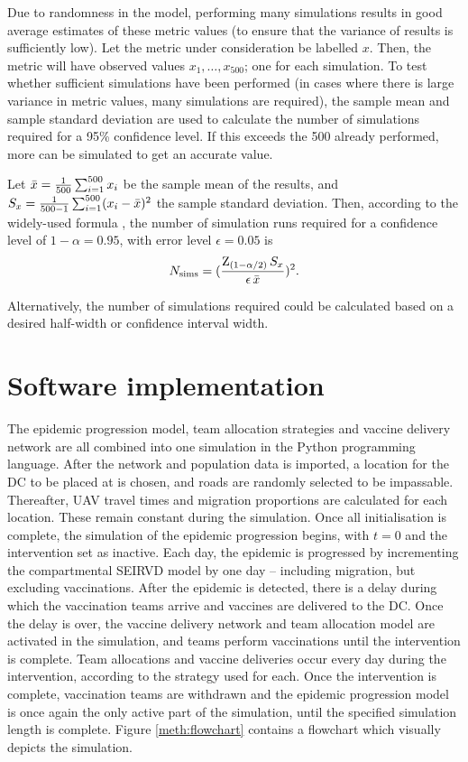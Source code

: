 Due to randomness in the model, performing many simulations results in good average estimates of these metric values (to ensure that the variance of results is sufficiently low). Let the metric under consideration be labelled $x$. Then, the metric will have observed values $x_{1}, \dots, x_{500}$; one for each simulation. To test whether sufficient simulations have been performed (in cases where there is large variance in metric values, many simulations are required), the sample mean and sample standard deviation are used to calculate the number of simulations required for a 95\% confidence level. If this exceeds the 500 already performed, more can be simulated to get an accurate value. 

Let $\Bar{x} = \frac{1}{500} \sum^{500}_{i=1} x_{i}$ be the sample mean of the results, and $S_{x} = \frac{1}{500-1} \sum^{500}_{i=1} (x_{i} - \Bar{x})^{2}$ the sample standard deviation. Then, according to the widely-used formula \cite{driels_shin_2004}, the number of simulation runs required for a confidence level of $1 - \alpha = 0.95$, with error level $\epsilon = 0.05$ is
$$N_{\text{sims}} = (\frac{\text{Z}_{(1-\alpha/2)} \, S_{x}}{\epsilon \, \Bar{x}})^{2}.$$

Alternatively, the number of simulations required could be calculated based on a desired half-width or confidence interval width.

\section{Software implementation}
\label{sec:meth_softImp}
The epidemic progression model, team allocation strategies and vaccine delivery network are all combined into one simulation in the Python programming language. After the network and population data is imported, a location for the DC to be placed at is chosen, and roads are randomly selected to be impassable. Thereafter, UAV travel times and migration proportions are calculated for each location. These remain constant during the simulation. Once all initialisation is complete, the simulation of the epidemic progression begins, with $t=0$ and the intervention set as inactive. Each day, the epidemic is progressed by incrementing the compartmental SEIRVD model by one day -- including migration, but excluding vaccinations.
After the epidemic is detected, there is a delay during which the vaccination teams arrive and vaccines are delivered to the DC. Once the delay is over, the vaccine delivery network and team allocation model are activated in the simulation, and teams perform vaccinations until the intervention is complete. Team allocations and vaccine deliveries occur every day during the intervention, according to the strategy used for each. Once the intervention is complete, vaccination teams are withdrawn and the epidemic progression model is once again the only active part of the simulation, until the specified simulation length is complete. Figure \ref{meth:flowchart} contains a flowchart which visually depicts the simulation.

